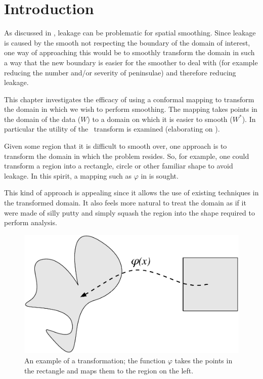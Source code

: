 \label{chap-sc}
\section{Introduction}

As discussed in , leakage can be problematic for spatial smoothing. Since leakage is caused by the smooth not respecting the boundary of the domain of interest, one way of approaching this would be to smoothly transform the domain in such a way that the new boundary is easier for the smoother to deal with (for example reducing the number and/or severity of peninsulae) and therefore reducing leakage.

This chapter investigates the efficacy of using a conformal mapping to transform the domain in which we wish to perform smoothing. The mapping takes points in the domain of the data ($W$) to a domain on which it is easier to smooth ($W^*$). In particular the utility of the \sch\ transform is examined (elaborating on \cite{eilerstalk}).

Given some region that it is difficult to smooth over, one approach is to transform the domain in which the problem resides. So, for example, one could transform a region into a rectangle, circle or other familiar shape to avoid leakage. In this spirit, a mapping such as $\varphi$ in  is sought.

This kind of approach is appealing since it allows the use of existing techniques in the transformed domain. It also feels more natural to treat the domain as if it were made of silly putty and simply squash the region into the shape required to perform analysis.

\begin{figure} [t]
\centering
\includegraphics[scale=0.3]{sc/figs/simpledia.pdf}
\caption{An example of a transformation; the function $\varphi$ takes the points in the rectangle and maps them to the region on the left.}
\label{simpledia}
\end{figure}

